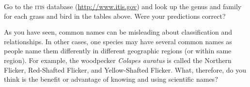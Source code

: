 \documentclass[11pt]{exam}
\begin{document}
\begin{questions}
\bigskip

\question
Go to the \textsc{itis} database (\url{http://www.itis.gov}) and look up the genus %
and family for each grass and bird in the tables above. Were your predictions correct?

\vspace*{2\baselineskip}

\question[Checkout]
As you have seen, common names can be misleading about classification and relationships. In other cases, one species may have several common names as people name them differently in different geographic regions (or within same region). For example, the woodpecker \textit{Colapes auratus} is called the Northern Flicker, Red-Shafted Flicker, and Yellow-Shafted Flicker. What, therefore, do you think is the benefit or advantage of knowing and using scientific names?

\end{questions}
\end{document}
